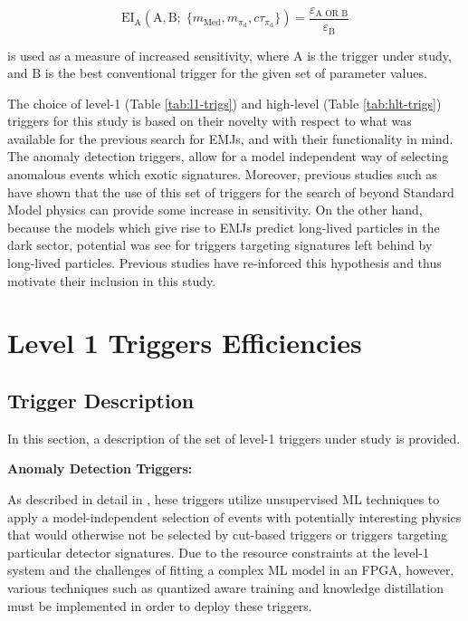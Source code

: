 \begin{equation}
    \text{EI}_{\text{A}} (\text{A}, \text{B};\;\{m_{\text{Med}}, m_{\pi_{\text{d}}},c\tau_{\pi_{\text{d}}}\}) = \frac{\varepsilon_{\text{A OR B}}}{\varepsilon_{\text{B}}}
\end{equation}

is used as a measure of increased sensitivity, where $\text{A}$ is the trigger under study, and $\text{B}$ is the best conventional trigger for the given set of parameter values.

The choice of level-1 (Table \ref{tab:l1-trigs}) and high-level (Table \ref{tab:hlt-trigs}) triggers for this study is based on their novelty with respect to what was available for the previous search for EMJs, and with their functionality in mind. The anomaly detection triggers, allow for a model independent way of selecting anomalous events which exotic signatures. Moreover, previous studies such as \cite{} have shown that the use of this set of triggers for the search of beyond Standard Model physics can provide some increase in sensitivity. On the other hand, because the models which give rise to EMJs predict long-lived particles in the dark sector, potential was see for triggers targeting signatures left behind by long-lived particles. Previous studies have re-inforced this hypothesis \cite{} and thus motivate their inclusion in this study.

\section{Level 1 Triggers Efficiencies}

\subsection{Trigger Description}

In this section, a description of the set of level-1 triggers under study is provided.

\noindent\textbf{Anomaly Detection Triggers:} 

As described in detail in \cite{}, hese triggers utilize unsupervised ML techniques to apply a model-independent selection of events with potentially interesting physics that would otherwise not be selected by cut-based triggers or triggers targeting particular detector signatures. Due to the resource constraints at the level-1 system and the challenges of fitting a complex ML model in an FPGA, however, various techniques such as quantized aware training and knowledge distillation must be implemented in order to deploy these triggers.


